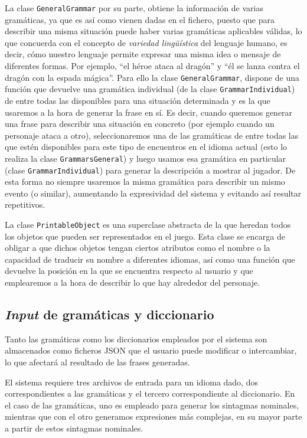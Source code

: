 La clase \texttt{GeneralGrammar} por su parte, obtiene la información de varias gramáticas, ya que es así como vienen dadas en el fichero, puesto que para describir una misma situación puede haber varias gramáticas aplicables válidas, lo que concuerda con el concepto de \emph{variedad lingüística} del lenguaje humano,\cite{AraWeiBomKos2000a} es decir, cómo nuestro lenguaje permite expresar una misma idea o mensaje de diferentes formas. Por ejemplo, ``el héroe ataca al dragón'' y ``él se lanza contra el dragón con la espada mágica''. 
Para ello la clase \texttt{GeneralGrammar}, dispone de una función que devuelve una gramática individual (de la clase \texttt{GrammarIndividual}) de entre todas las disponibles para una situación determinada y es la que usaremos a la hora de generar la frase en sí. Es decir, cuando queremos generar una frase para describir una situación en concreto (por ejemplo cuando un personaje ataca a otro), seleccionaremos una de las gramáticas de entre todas las que estén disponibles para este tipo de encuentros en el idioma actual (esto lo realiza la clase \texttt{GrammarsGeneral}) y luego usamos esa gramática en particular (clase \texttt{GrammarIndividual}) para generar la descripción a mostrar al jugador. De esta forma no siempre usaremos la misma gramática para describir un mismo evento (o similar), aumentando la expresividad del sistema y evitando así resultar repetitivos.

La clase \texttt{PrintableObject} es una superclase abstracta de la que heredan todos los objetos que pueden ser representados en el juego. Esta clase se encarga de obligar a que dichos objetos tengan ciertos atributos como el nombre o la capacidad de traducir su nombre a diferentes idiomas, así como una función que devuelve la posición en la que se encuentra respecto al usuario y que emplearemos a la hora de describir lo que hay alrededor del personaje.

\subsection{\textit{Input} de gramáticas y diccionario}

Tanto las gramáticas como los diccionarios empleados por el sistema son almacenados como ficheros JSON que el usuario puede modificar o intercambiar, lo que afectará al resultado de las frases generadas.

El sistema requiere tres archivos de entrada para un idioma dado, dos correspondientes a las gramáticas y el tercero correspondiente al diccionario. En el caso de las gramáticas, uno es empleado para generar los sintagmas nominales, mientras que con el otro generamos expresiones más complejas, en su mayor parte a partir de estos sintagmas nominales.

